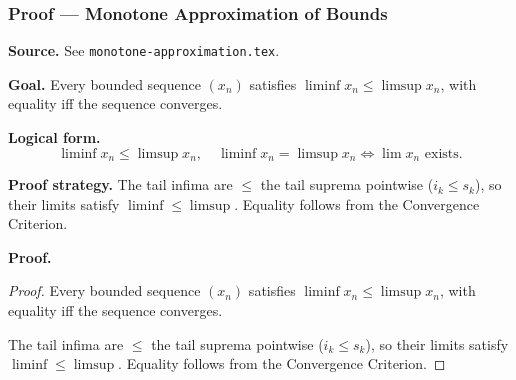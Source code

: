 
\clearpage
{}
\hypertarget{proof-RA-ABB-P-monotone-approx}{}

\subsubsection[Monotone Approximation of Bounds]{Proof --- Monotone Approximation of Bounds}

\bigskip

\noindent
\textbf{Source.} See \texttt{monotone-approximation.tex}.

\vspace{0.75em}

\noindent
\textbf{Goal.} Every bounded sequence $(x_n)$ satisfies $\liminf x_n \le \limsup x_n$, with equality iff the sequence converges.

\vspace{0.75em}

\noindent
\textbf{Logical form.}
\[
  \liminf x_n \le \limsup x_n,\quad \liminf x_n = \limsup x_n \Longleftrightarrow \lim x_n \text{ exists}.
\]

\vspace{0.75em}

\noindent
\textbf{Proof strategy.} The tail infima are $\le$ the tail suprema pointwise ($i_k \le s_k$), so their limits satisfy $\liminf \le \limsup$. Equality follows from the Convergence Criterion.

\vspace{0.75em}

\noindent
\textbf{Proof.}
\begin{proof}
\Claim Every bounded sequence $(x_n)$ satisfies $\liminf x_n \le \limsup x_n$, with equality iff the sequence converges.

\Given 

\Goal 

\Strategy The tail infima are $\le$ the tail suprema pointwise ($i_k \le s_k$), so their limits satisfy $\liminf \le \limsup$. Equality follows from the Convergence Criterion.

\medskip


\end{proof}

